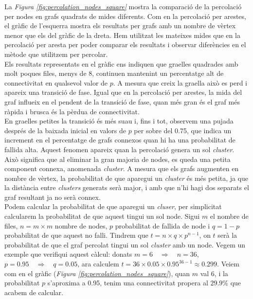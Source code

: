 \documentclass[a4paper]{article}
\begin{document}
	La \textit{Figura \ref{fig:percolation_nodes_square}} mostra la comparació de la percolació per nodes en grafs quadrats de mides diferents. Com en la percolació per arestes, el gràfic de l'esquerra mostra els resultats per grafs amb un nombre de vèrtex menor que els del gràfic de la dreta. Hem utilitzat les mateixes mides que en la percolació per aresta per poder comparar els resultats i observar diferències en el mètode que utilitzem per percolar. \\
	
	Els resultats representats en el gràfic ens indiquen que graelles quadrades amb molt poques files, menys de 8, continuen mantenint un percentatge alt de connectivitat en qualsevol valor de $p$. A mesura que creix la graella això es perd i apareix una transició de fase. Igual que en la percolació per arestes, la mida del graf influeix en el pendent de la transició de fase, quan més gran és el graf més ràpida i brusca és la pèrdua de connectivitat. \\
	
	En graelles petites la transició és més suau i, fins i tot, observem una pujada després de la baixada inicial en valors de $p$ per sobre del 0.75, que indica un increment en el percentatge de grafs connexos quan hi ha una probabilitat de fallida alta. Aquest fenomen apareix quan la percolació genera un sol \textit{cluster}. Això significa que al eliminar la gran majoria de nodes, es queda una petita component connexa, anomenada \textit{cluster}. A mesura que els grafs augmenten en nombre de vèrtex, la probabilitat de que aparegui un \textit{cluster} és més petita, ja que la distància entre \textit{clusters} generats serà major, i amb que n'hi hagi dos separats el graf resultant ja no serà connex. \\
	
	Podem calcular la probabilitat de que aparegui un \textit{cluser}, per simplicitat calcularem la probabilitat de que aquest tingui un sol node. Sigui $m$ el nombre de files, $n = m \times m$ nombre de nodes, $p$ probabilitat de fallida de node i $q = 1 - p$ probabilitat de que aquest no falli. Tindrem que $t = n \times q \times p^{n-1}$, on $t$ serà la probabilitat de que el graf percolat tingui un sol \textit{cluster} amb un node. Vegem un exemple que verifiqui aquest càlcul: donats $m = 6 \quad \Rightarrow \quad n = 36$, $p = 0.95 \quad \Rightarrow \quad q = 0.05$, ara calculem $t = 36 \times 0.05 \times 0.95^{36-1} \approx 0.299$. Veiem com en el gràfic (\textit{Figura \ref{fig:percolation_nodes_square}}), quan $m$ val 6, i la probabilitat $p$ s'aproxima a 0.95, tenim una connectivitat propera al $29.9\%$ que acabem de calcular. \\
	
\end{document}

